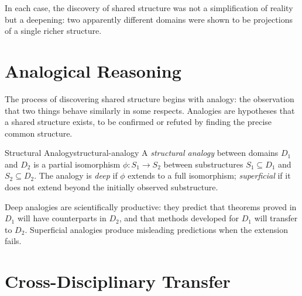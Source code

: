In each case, the discovery of shared structure was not a simplification
of reality but a deepening: two apparently different domains were shown
to be projections of a single richer structure.

\section{Analogical Reasoning}

The process of discovering shared structure begins with analogy: the
observation that two things behave similarly in some respects. Analogies
are hypotheses that a shared structure exists, to be confirmed or refuted
by finding the precise common structure.

\begin{definition}{Structural Analogy}{structural-analogy}
  A \emph{structural analogy} between domains $D_1$ and $D_2$ is a
  partial isomorphism $\phi : S_1 \to S_2$ between substructures
  $S_1 \subseteq D_1$ and $S_2 \subseteq D_2$. The analogy is
  \emph{deep} if $\phi$ extends to a full isomorphism; \emph{superficial}
  if it does not extend beyond the initially observed substructure.
\end{definition}

Deep analogies are scientifically productive: they predict that
theorems proved in $D_1$ will have counterparts in $D_2$, and that
methods developed for $D_1$ will transfer to $D_2$. Superficial
analogies produce misleading predictions when the extension fails.

\section{Cross-Disciplinary Transfer}

